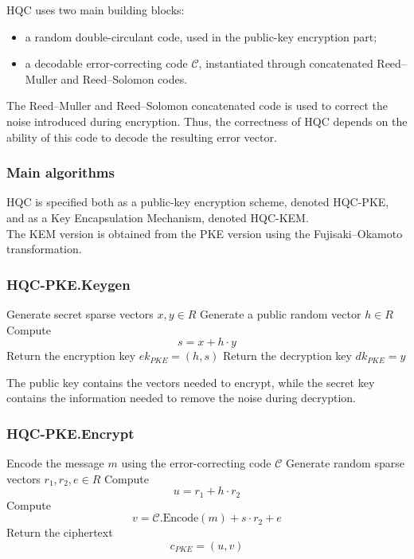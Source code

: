 \noindent
HQC uses two main building blocks:
\begin{itemize}
    \item a random double-circulant code, used in the public-key encryption part;
    \item a decodable error-correcting code \(\mathcal{C}\), instantiated through 
    concatenated Reed--Muller and Reed--Solomon codes.
\end{itemize}

\medskip

\noindent
The Reed--Muller and Reed--Solomon concatenated code is used to correct the 
noise introduced during encryption. Thus, the correctness of HQC depends on the 
ability of this code to decode the resulting error vector.

\subsubsection{Main algorithms}

HQC is specified both as a public-key encryption scheme, denoted HQC-PKE, and as a Key Encapsulation Mechanism, denoted HQC-KEM.\\ 
The KEM version is obtained from the PKE version using the Fujisaki--Okamoto transformation.

\subsubsection*{HQC-PKE.Keygen}

\begin{algorithm}
\begin{algorithmic}[1]
    \State Generate secret sparse vectors \(x,y \in R\)
    \State Generate a public random vector \(h \in R\)
    \State Compute
    \[
        s = x + h \cdot y
    \]
    \State Return the encryption key \(ek_{PKE} = (h,s)\)
    \State Return the decryption key \(dk_{PKE} = y\)
\end{algorithmic}
\end{algorithm}

\noindent
The public key contains the vectors needed to encrypt, while the secret key contains the information needed to remove the noise during decryption.

\subsubsection*{HQC-PKE.Encrypt}

\begin{algorithm}
\begin{algorithmic}[1]
    \State Encode the message \(m\) using the error-correcting code \(\mathcal{C}\)
    \State Generate random sparse vectors \(r_1,r_2,e \in R\)
    \State Compute
    \[
        u = r_1 + h \cdot r_2
    \]
    \State Compute
    \[
        v = \mathcal{C}.\text{Encode}(m) + s \cdot r_2 + e
    \]
    \State Return the ciphertext
    \[
        c_{PKE} = (u,v)
    \]
\end{algorithmic}
\end{algorithm}

